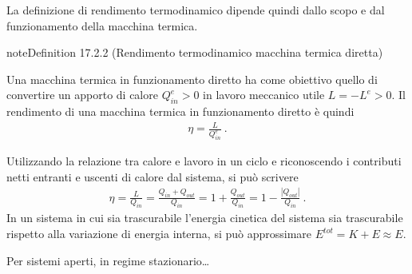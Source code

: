 \documentclass[letterpaper,10pt,italian]{jupyterBook}
\begin{document}
\sphinxAtStartPar
La definizione di rendimento termodinamico dipende quindi dallo scopo e dal funzionamento della macchina termica.
\label{ch/thermodynamics/heat-engine-td-cycles:td-efficiency-direct}
\begin{sphinxadmonition}{note}{Definition 17.2.2 (Rendimento termodinamico \sphinxhyphen{} macchina termica diretta)}



\sphinxAtStartPar
Una macchina termica in funzionamento diretto ha come obiettivo quello di convertire un apporto di calore \(Q^{e}_{in} > 0\) in lavoro meccanico utile \(L = -L^e > 0\). Il rendimento di una macchina termica in funzionamento diretto è quindi
\begin{equation*}
\begin{split}\eta = \frac{L}{Q^{e}_{in}} \ .\end{split}
\end{equation*}\end{sphinxadmonition}

\sphinxAtStartPar
Utilizzando la relazione tra calore e lavoro in un ciclo  e riconoscendo i contributi netti entranti e uscenti di calore dal sistema, si può scrivere
\begin{equation*}
\begin{split}\eta = \frac{L}{Q_{in}} = \frac{Q_{in} + Q_{out}}{Q_{in}} = 1 + \frac{Q_{out}}{Q_{in}} = 1 - \frac{|Q_{out}|}{Q_{in}} \ .\end{split}
\end{equation*}
\sphinxAtStartPar
{} In un sistema in cui sia trascurabile l’energia cinetica del sistema sia trascurabile rispetto alla variazione di energia interna, si può approssimare \(E^{tot} = K + E \approx E\).

\sphinxAtStartPar
{} Per sistemi aperti, in regime stazionario…

\sphinxstepscope
\end{document}
